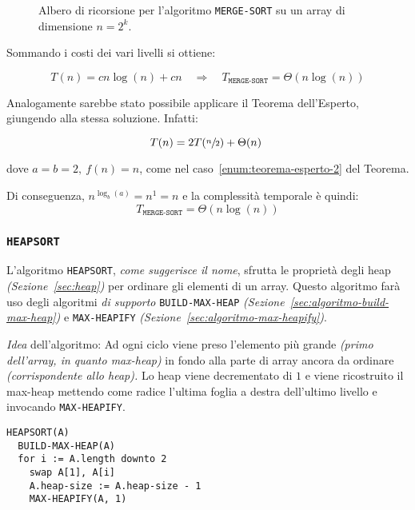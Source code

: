 \documentclass[italian, 10pt]{article}
\begin{document}
\begin{figure}[htbp]
  \bigskip
  \centering
  \caption{Albero di ricorsione per l'algoritmo \texttt{MERGE-SORT} su un array di dimensione \(n = 2^k\).}
  \label{fig:albero-ricorsione-algoritmo-merge-sort}
  \bigskip
\end{figure}

Sommando i costi dei vari livelli si ottiene:

\[ T(n) = cn \log{(n)} + cn \quad \Rightarrow \quad T_\texttt{MERGE-SORT} = \Theta(n \log{(n)}) \]

\bigskip
Analogamente sarebbe stato possibile applicare il Teorema dell'Esperto, giungendo alla stessa soluzione.
Infatti:

\[ T(n) = 2T(\sfrac{n}{2}) + \Theta(n)\ \]

dove \(a = b = 2,\ f(n) = n\), come nel caso~\ref{enum:teorema-esperto-2} del Teorema.

Di conseguenza, \(n^{\log_b(a)} = n^1 = n\) e la complessità temporale è quindi:
\[ T_{\texttt{MERGE-SORT}} = \Theta(n \log{(n)}) \]

\subsubsection{\texttt{HEAPSORT}}
\label{sec:heap-sort}

L'algoritmo \texttt{HEAPSORT}, \textit{come suggerisce il nome}, sfrutta le proprietà degli heap \textit{(Sezione~\ref{sec:heap})} per ordinare gli elementi di un array.
Questo algoritmo farà uso degli algoritmi \textit{di supporto} \texttt{BUILD-MAX-HEAP} \textit{(Sezione~\ref{sec:algoritmo-build-max-heap})} e \texttt{MAX-HEAPIFY} \textit{(Sezione~\ref{sec:algoritmo-max-heapify})}.

\textit{Idea} dell'algoritmo:
Ad ogni ciclo viene preso l'elemento più grande \textit{(primo dell'array, in quanto max-heap)} in fondo alla parte di array ancora da ordinare \textit{(corrispondente allo heap).}
Lo heap viene decrementato di \(1\) e viene ricostruito il max-heap mettendo come radice l'ultima foglia a destra dell'ultimo livello e invocando \texttt{MAX-HEAPIFY}.

\begin{lstlisting}[style=pseudocode, caption={Pseudocodice dell'algoritmo \texttt{HEAPSORT}}, label={sec:algoritmo-heapsort}]
HEAPSORT(A)
  BUILD-MAX-HEAP(A)
  for i := A.length downto 2
    swap A[1], A[i]
    A.heap-size := A.heap-size - 1
    MAX-HEAPIFY(A, 1)
\end{lstlisting}
\end{document}
